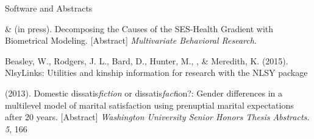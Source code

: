 \begin{rSection}{\textrm{Software and Abstracts}}%
\begin{etaremune}
\item\meb \& \joe (in press). Decomposing the Causes of the SES-Health Gradient with Biometrical Modeling.  [Abstract] \textit{Multivariate Behavioral Research}.
\item  Beasley, W., Rodgers, J. L., Bard, D., Hunter, M., \meb, \& Meredith, K. (2015). NlsyLinks: Utilities and kinship information for research with the NLSY \R package \href{https://cran.r-project.org/web/packages/NlsyLinks}{\color{blue}{https://cran.r-project.org/web/packages/NlsyLinks}}
\item\meb (2013). Domestic dissatis{\em fiction} or dissatis{\em fact}ion?: Gender differences in a multilevel model of marital satisfaction using prenuptial marital expectations after 20 years. [Abstract] {\em Washington University Senior Honors Thesis Abstracts. 5}, 166
\end{etaremune}
\end{rSection}